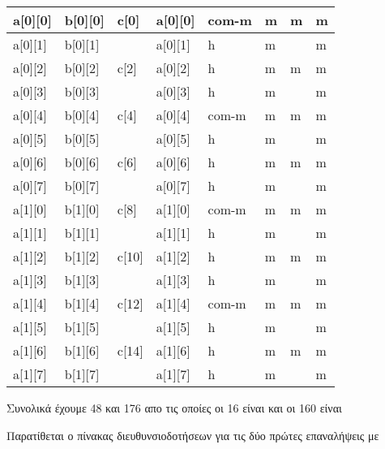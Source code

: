 \documentclass[10pt]{assignment}
\begin{document}
\begin{center}
\begin{tabularx}{\textwidth}{|Z|Z|Z|Z|Y|Y|Y|Y|}
\hline
a[0][0] & b[0][0] & c[0] & a[0][0] & com-m & m & m & m \\
\hline
a[0][1] & b[0][1] &      & a[0][1] & h & m & & m \\
\hline
a[0][2] & b[0][2] & c[2] & a[0][2] & h & m & m & m \\
\hline
a[0][3] & b[0][3] &      & a[0][3] & h & m & & m \\
\hline
a[0][4] & b[0][4] & c[4] & a[0][4] & com-m & m & m & m \\
\hline
a[0][5] & b[0][5] &      & a[0][5] & h & m & & m \\
\hline
a[0][6] & b[0][6] & c[6] & a[0][6] & h & m & m & m \\
\hline
a[0][7] & b[0][7] &      & a[0][7] & h & m & & m \\
\hline
a[1][0] & b[1][0] & c[8] & a[1][0] & com-m & m & m & m \\
\hline
a[1][1] & b[1][1] &      & a[1][1] & h & m & & m \\
\hline
a[1][2] & b[1][2] & c[10] & a[1][2] & h & m & m & m \\
\hline
a[1][3] & b[1][3] &       & a[1][3] & h & m & & m \\
\hline
a[1][4] & b[1][4] & c[12] & a[1][4] & com-m & m & m & m \\
\hline
a[1][5] & b[1][5] &       & a[1][5] & h & m & & m \\
\hline
a[1][6] & b[1][6] & c[14] & a[1][6] & h & m & m & m \\
\hline
a[1][7] & b[1][7] &       & a[1][7] & h & m & & m \\
\hline
\end{tabularx}
\end{center}
\vspace{4pt}

Συνολικά έχουμε 48  και 176  απο τις οποίες οι 16 είναι  και 
οι 160 είναι 

\newpage
Παρατίθεται ο πίνακας διευθυνσιοδοτήσεων για τις δύο πρώτες επαναλήψεις με 
\end{document}
